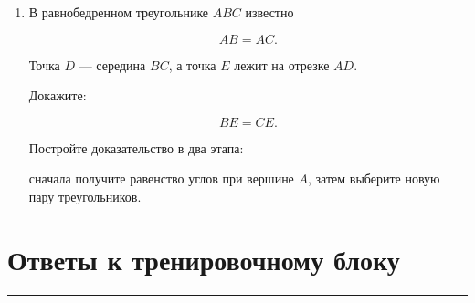 \documentclass[a4paper,12pt]{article}
\newcommand{\sectionline}{
  \par
  \vspace{0.2em}
  \textcolor{lightline}{\rule{\linewidth}{0.8pt}}
  \par
  \vspace{0.35em}
}
\begin{document}
\begin{enumerate}[
  label=\textbf{\arabic*.},
  start=10
]

\item
В равнобедренном треугольнике $ABC$
известно

\[
AB=AC.
\]

Точка $D$ --- середина $BC$,
а точка $E$ лежит на отрезке $AD$.

Докажите:

\[
BE=CE.
\]

Постройте доказательство в два этапа:

сначала получите равенство углов при вершине $A$,
затем выберите новую пару треугольников.

\begin{center}


\end{center}

\end{enumerate}


\clearpage

\section*{Ответы к тренировочному блоку}
\sectionline

\footnotesize
\end{document}
